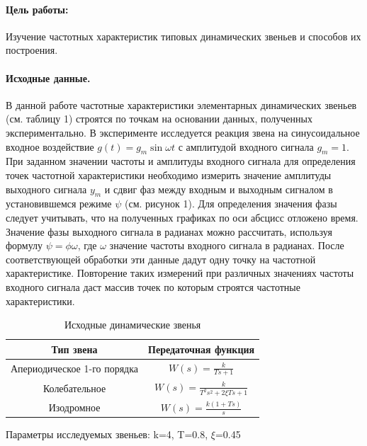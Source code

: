 \documentclass[a4paper,12pt]{article} %
\begin{document}


\paragraph{Цель работы:}Изучение частотных характеристик типовых динамических звеньев и способов их построения.%
\paragraph{Исходные данные.}
В данной работе частотные характеристики элементарных динамических звеньев (см. таблицу 1) строятся по точкам на основании данных, полученных экспериментально. В эксперименте исследуется реакция звена на синусоидальное входное воздействие $g(t) = g_m\sin{\omega t}$ с амплитудой входного сигнала $g_m=1$. При заданном значении частоты и амплитуды входного сигнала для определения точек частотной характеристики необходимо измерить значение амплитуды выходного сигнала $y_m$ и сдвиг фаз между входным и выходным сигналом в установившемся режиме $\psi$ (см. рисунок 1). Для определения значения фазы следует учитывать, что на полученных графиках по оси абсцисс отложено время. Значение фазы выходного сигнала в радианах можно рассчитать, используя формулу $\psi=\phi\omega$, где $\omega$ значение частоты входного сигнала в радианах. После соответствующей обработки эти данные дадут одну точку на частотной характеристике. Повторение таких измерений при различных значениях частоты входного сигнала даст массив точек по которым строятся частотные характеристики.
\begin{table}[h!]
	\renewcommand{\arraystretch}{1.8} %
	\centering
	\begin{threeparttable}
		\caption{Исходные динамические звенья}
		\begin{tabular}{|c|c|}
			\hline Тип звена & Передаточная функция\\
			\hline Апериодическое 1-го порядка & $W(s) = 
			\displaystyle{\frac{k}{Ts + 1}}$ \\
			\hline Колебательное & $W(s) =
			\displaystyle{\frac{k}{T^2s^2 + 2\xi Ts + 1}}$ \\ 
			\hline Изодромное & $W(s) = \displaystyle{\frac{k(1 + Ts)}{s}}$ \\
			\hline
		\end{tabular}
	\end{threeparttable}
\end{table} 
\par
Параметры исследуемых звеньев: k=4, T=0.8, $\xi$=0.45
\end{document}
